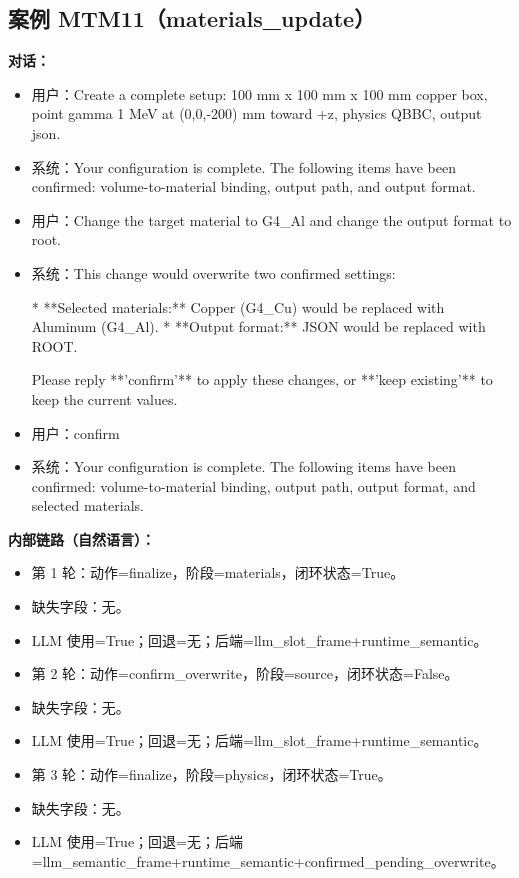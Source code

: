 \documentclass[11pt]{ctexart}
\begin{document}
\subsection{案例 MTM11（materials\_update）}
\textbf{对话：}
\begin{itemize}
\item 用户：Create a complete setup: 100 mm x 100 mm x 100 mm copper box, point gamma 1 MeV at (0,0,-200) mm toward +z, physics QBBC, output json.
\item 系统：Your configuration is complete. The following items have been confirmed: volume-to-material binding, output path, and output format.
\item 用户：Change the target material to G4\_Al and change the output format to root.
\item 系统：This change would overwrite two confirmed settings:

*   **Selected materials:** Copper (G4\_Cu) would be replaced with Aluminum (G4\_Al).
*   **Output format:** JSON would be replaced with ROOT.

Please reply **'confirm'** to apply these changes, or **'keep existing'** to keep the current values.
\item 用户：confirm
\item 系统：Your configuration is complete. The following items have been confirmed: volume-to-material binding, output path, output format, and selected materials.
\end{itemize}
\textbf{内部链路（自然语言）：}
\begin{itemize}
\item 第 1 轮：动作=finalize，阶段=materials，闭环状态=True。
\item 缺失字段：无。
\item LLM 使用=True；回退=无；后端=llm\_slot\_frame+runtime\_semantic。
\item 第 2 轮：动作=confirm\_overwrite，阶段=source，闭环状态=False。
\item 缺失字段：无。
\item LLM 使用=True；回退=无；后端=llm\_slot\_frame+runtime\_semantic。
\item 第 3 轮：动作=finalize，阶段=physics，闭环状态=True。
\item 缺失字段：无。
\item LLM 使用=True；回退=无；后端=llm\_semantic\_frame+runtime\_semantic+confirmed\_pending\_overwrite。
\end{itemize}
\end{document}
